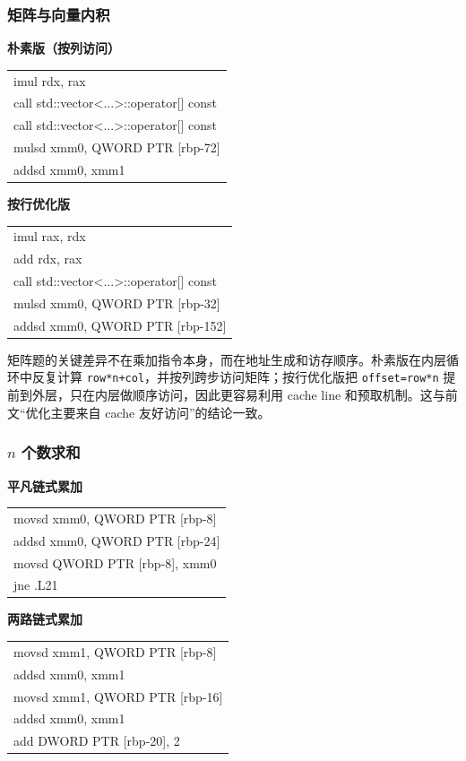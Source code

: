 ﻿\documentclass[UTF8,a4paper,12pt]{ctexart}
\newcommand{\asmfont}{\ttfamily\fontsize{6.8pt}{7.2pt}\selectfont}
\begin{document}
\subsubsection{矩阵与向量内积}
\noindent
\begin{minipage}[t]{0.48\textwidth}
\textbf{朴素版（按列访问）}

{\asmfont
\begin{tabular}{@{}l@{}}
imul    rdx, rax \\
call    std::vector<...>::operator[] const \\
call    std::vector<...>::operator[] const \\
mulsd   xmm0, QWORD PTR [rbp-72] \\
addsd   xmm0, xmm1
\end{tabular}}
\end{minipage}\hfill
\begin{minipage}[t]{0.48\textwidth}
\textbf{按行优化版}

{\asmfont
\begin{tabular}{@{}l@{}}
imul    rax, rdx \\
add     rdx, rax \\
call    std::vector<...>::operator[] const \\
mulsd   xmm0, QWORD PTR [rbp-32] \\
addsd   xmm0, QWORD PTR [rbp-152]
\end{tabular}}
\end{minipage}

矩阵题的关键差异不在乘加指令本身，而在地址生成和访存顺序。朴素版在内层循环中反复计算 \texttt{row*n+col}，并按列跨步访问矩阵；按行优化版把 \texttt{offset=row*n} 提前到外层，只在内层做顺序访问，因此更容易利用 cache line 和预取机制。这与前文“优化主要来自 cache 友好访问”的结论一致。

\subsubsection{\(n\) 个数求和}
\noindent
\begin{minipage}[t]{0.48\textwidth}
\textbf{平凡链式累加}

{\asmfont
\begin{tabular}{@{}l@{}}
movsd   xmm0, QWORD PTR [rbp-8] \\
addsd   xmm0, QWORD PTR [rbp-24] \\
movsd   QWORD PTR [rbp-8], xmm0 \\
jne     .L21
\end{tabular}}
\end{minipage}\hfill
\begin{minipage}[t]{0.48\textwidth}
\textbf{两路链式累加}

{\asmfont
\begin{tabular}{@{}l@{}}
movsd   xmm1, QWORD PTR [rbp-8] \\
addsd   xmm0, xmm1 \\
movsd   xmm1, QWORD PTR [rbp-16] \\
addsd   xmm0, xmm1 \\
add     DWORD PTR [rbp-20], 2
\end{tabular}}
\end{minipage}
\end{document}
